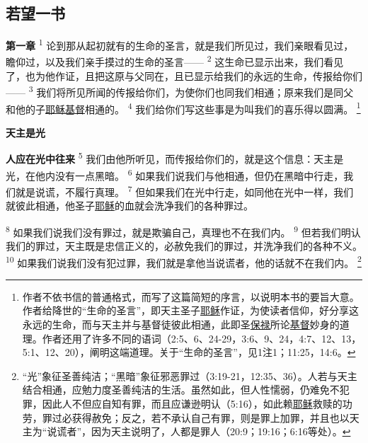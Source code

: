 \setlength\columnsep{0.6cm}
\begin{multicols}{2}

\chapter*{若望一书}


\textbf{第一章\quad}
\textsuperscript{1}
论到那从起初就有的生命的圣言，就是我们所见过，我们亲眼看见过，瞻仰过，以及我们亲手摸过的生命的圣言——
\textsuperscript{2}
这生命已显示出来，我们看见了，也为他作证，且把这原与父同在，且已显示给我们的永远的生命，传报给你们——
\textsuperscript{3}
我们将所见所闻的传报给你们，为使你们也同我们相通；原来我们是同父和他的子\uline{耶稣}\uline{基督}相通的。
\textsuperscript{4}
我们给你们写这些事是为叫我们的喜乐得以圆满。
\renewcommand\thefootnote{\ding{\numexpr171+\value{footnote}}}
\footnote{作者不依书信的普通格式，而写了这篇简短的序言，以说明本书的要旨大意。作者给降世的“生命的圣言”，即天主圣子\uline{耶稣}作证，为使读者信仰，好分享这永远的生命，而与天主并与基督徒彼此相通，此即圣\uline{保禄}所论\uline{基督}妙身的道理。作者还用了许多不同的语词（2:5、6、24-29，3:6、9、24，4:7、12、13，5:1、12、20），阐明这端道理。关于“生命的圣言”，见1注1；11:25，14:6。}

\begin{center}
	\textbf{\large{\songti 天主是光}}
\end{center}

\textbf{人应在光中往来\quad}
\textsuperscript{5}
我们由他所听见，而传报给你们的，就是这个信息：天主是光，在他内没有一点黑暗。
\textsuperscript{6}
如果我们说我们与他相通，但仍在黑暗中行走，我们就是说谎，不履行真理。
\textsuperscript{7}
但如果我们在光中行走，如同他在光中一样，我们就彼此相通，他圣子\uline{耶稣}的血就会洗净我们的各种罪过。

\textsuperscript{8}
如果我们说我们没有罪过，就是欺骗自己，真理也不在我们内。
\textsuperscript{9}
但若我们明认我们的罪过，天主既是忠信正义的，必赦免我们的罪过，并洗净我们的各种不义。
\textsuperscript{10}
如果我们说我们没有犯过罪，我们就是拿他当说谎者，他的话就不在我们内。
\footnote{“光”象征圣善纯洁；“黑暗”象征邪恶罪过（3:19-21，12:35、36）。人若与天主结合相通，应勉力度圣善纯洁的生活。虽然如此，但人性懦弱，仍难免不犯罪，因此人不但应自知有罪，而且应谦逊明认（5:16），如此赖\uline{耶稣}救赎的功劳，罪过必获得赦免；反之，若不承认自己有罪，则是罪上加罪，并且也以天主为“说谎者”，因为天主说明了，人都是罪人（20:9；19:16；6:16等处）。}


\end{multicols}
